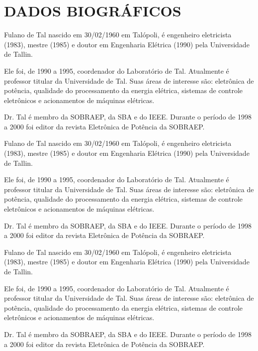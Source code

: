 
\section*{DADOS BIOGRÁFICOS}


\begin{biografia}{Fulano de Tal}
	nascido em 30/02/1960 em Talópoli, é engenheiro eletricista (1983), mestre (1985) e doutor em Engenharia Elétrica (1990) pela Universidade de Tallin.
	
	Ele foi, de 1990 a 1995, coordenador do Laboratório de Tal. Atualmente é professor titular da Universidade de Tal. Suas áreas de interesse são: eletrônica de potência, qualidade do processamento da energia elétrica, sistemas de controle eletrônicos e acionamentos de máquinas elétricas.
	
	Dr. Tal é membro da SOBRAEP, da SBA e do IEEE. Durante o período de 1998 a 2000 foi editor da revista Eletrônica de Potência da SOBRAEP.
\end{biografia}



\begin{biografia}{Fulano de Tal}
	nascido em 30/02/1960 em Talópoli, é engenheiro eletricista (1983), mestre (1985) e doutor em Engenharia Elétrica (1990) pela Universidade de Tallin.
	
	Ele foi, de 1990 a 1995, coordenador do Laboratório de Tal. Atualmente é professor titular da Universidade de Tal. Suas áreas de interesse são: eletrônica de potência, qualidade do processamento da energia elétrica, sistemas de controle eletrônicos e acionamentos de máquinas elétricas.
	
	Dr. Tal é membro da SOBRAEP, da SBA e do IEEE. Durante o período de 1998 a 2000 foi editor da revista Eletrônica de Potência da SOBRAEP.
\end{biografia}


\begin{biografia}{Fulano de Tal}
	nascido em 30/02/1960 em Talópoli, é engenheiro eletricista (1983), mestre (1985) e doutor em Engenharia Elétrica (1990) pela Universidade de Tallin.
	
	Ele foi, de 1990 a 1995, coordenador do Laboratório de Tal. Atualmente é professor titular da Universidade de Tal. Suas áreas de interesse são: eletrônica de potência, qualidade do processamento da energia elétrica, sistemas de controle eletrônicos e acionamentos de máquinas elétricas.
	
	Dr. Tal é membro da SOBRAEP, da SBA e do IEEE. Durante o período de 1998 a 2000 foi editor da revista Eletrônica de Potência da SOBRAEP.
\end{biografia}



